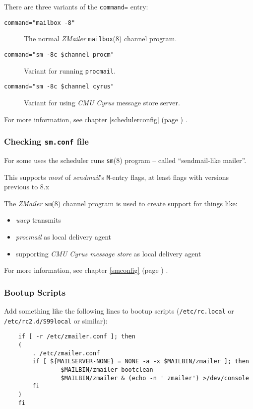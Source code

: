 There are three variants of the {\tt command=} entry:
\begin{description}
\item[{\tt command="mailbox -8"}] \mbox{}

The normal {\em ZMailer} {\tt mailbox}(8) channel program.

\item[{\tt command="sm -8c \$channel procm"}] \mbox{}

Variant for running {\tt procmail}.

\item[{\tt command="sm -8c \$channel cyrus"}] \mbox{}

Variant for using {\em CMU Cyrus} message store server.
\end{description}


For more information, see chapter
\ref{schedulerconfig}
(page \pageref{schedulerconfig})
.

\subsubsection{Checking {\tt sm.conf} file}%

For some uses the scheduler runs {\tt sm}(8) program -- called
``sendmail-like mailer''.

This supports {\em most} of {\em sendmail}'s {\tt M}-entry flags,
at least flags with versions previous to 8.x

The {\em ZMailer} {\tt sm}(8) channel program is used to create support
for things like:
\begin{itemize}
\item {\em uucp} transmits
\item {\em procmail} as local delivery agent
\item supporting {\em CMU Cyrus message store} as local delivery agent
\end{itemize}

For more information, see chapter
\ref{smconfig}
(page \pageref{smconfig})
.


\subsubsection{Bootup Scripts}

Add something like the following lines to bootup scripts ({\tt /etc/rc.local}
or {\tt /etc/rc2.d/S99local} or similar):
\begin{verbatim}
    if [ -r /etc/zmailer.conf ]; then
    (
        . /etc/zmailer.conf
        if [ ${MAILSERVER-NONE} = NONE -a -x $MAILBIN/zmailer ]; then
                $MAILBIN/zmailer bootclean
                $MAILBIN/zmailer & (echo -n ' zmailer') >/dev/console
        fi
    )
    fi
\end{verbatim}


